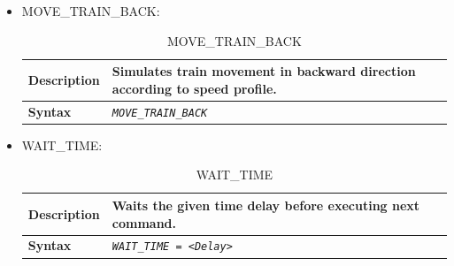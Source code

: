 \documentclass{template/openetcs}
\begin{document}
\begin{itemize}
	\item MOVE\_TRAIN\_BACK:
		
		\begin{longtable}{|l|l|}
		\caption{MOVE\_TRAIN\_BACK}\\ 
						
			\hline						
				
				\begin{minipage}[t]{0.22\linewidth} \textbf{Description} \end{minipage} 
			&	\begin{minipage}[t]{0.78\linewidth} Simulates train movement in backward direction according to speed profile. \end{minipage} \\
						
			\hline
									
				\begin{minipage}[t]{0.22\linewidth} \textbf{Syntax} \end{minipage}
			&	\begin{minipage}[t]{0.78\linewidth} \emph{\texttt{MOVE\_TRAIN\_BACK}} \end{minipage} \\
				
			\hline \hline
				
		\end{longtable}
	
	\item WAIT\_TIME:				
		
		\begin{longtable}{|l|l|}
		\caption{WAIT\_TIME}\\ 
				
			\hline						
				
				\begin{minipage}[t]{0.22\linewidth} \textbf{Description} \end{minipage} 
			&	\begin{minipage}[t]{0.78\linewidth} Waits the given time delay before executing next command. \end{minipage} \\
						
			\hline
									
				\begin{minipage}[t]{0.22\linewidth} \textbf{Syntax}	\end{minipage}
			&	\begin{minipage}[t]{0.78\linewidth} \emph{\texttt{WAIT\_TIME = <Delay>}} \end{minipage} \\
			

\end{longtable}
\end{itemize}
\end{document}
